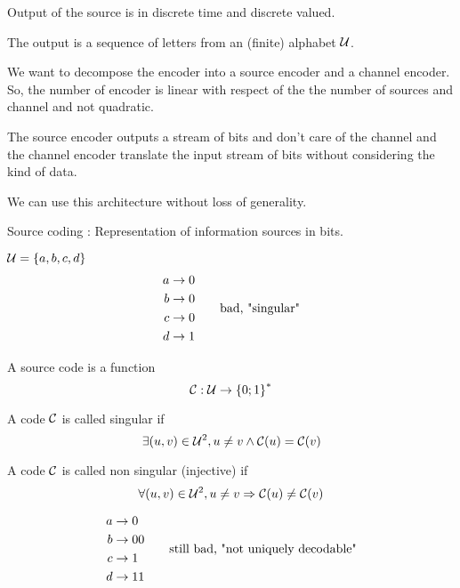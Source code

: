 Output of the source is in discrete time and discrete valued.

\begin{example}
    The output is a sequence of letters from an (finite) alphabet $\mathcal{U}$.
\end{example}

We want to decompose the encoder into a source encoder and a channel encoder. So, the number of encoder is linear with respect of the the number of sources and channel and not quadratic.

The source encoder outputs a stream of bits and don't care of the channel and the channel encoder translate the input stream of bits without considering the kind of data.

We can use this architecture without loss of generality.

\bigskip

Source coding : Representation of information sources in bits.

\begin{example}
    $\mathcal{U} = \left\{ a,b,c,d \right\}$
    \[
        \begin{aligned}
            a &\rightarrow 0\\
            b &\rightarrow 0\\
            c &\rightarrow 0\\
            d &\rightarrow 1
        \end{aligned}
        \qquad \text{bad, "singular"}            
    \]
\end{example}

A source code is a function
\[
    \mathcal{C} : \mathcal{U} \rightarrow \left\{ 0;1 \right\}^*
\]

\begin{definition}
    A code $\mathcal{C}$ is called singular  if
    \[
        \exists (u,v) \in \mathcal{U}^2, u \neq v \wedge \mathcal{C}(u) = \mathcal{C}(v)
    \]
\end{definition}

\begin{definition}
    A code $\mathcal{C}$ is called non singular (injective) if
    \[
        \forall (u,v) \in \mathcal{U}^2, u \neq v \Rightarrow \mathcal{C}(u) \neq \mathcal{C}(v)
    \]
\end{definition}

\begin{example}
    \[
        \begin{aligned}
            a &\rightarrow 0\\
            b &\rightarrow 00\\
            c &\rightarrow 1\\
            d &\rightarrow 11
        \end{aligned}
        \qquad \text{still bad, "not uniquely decodable"}            
    \]
\end{example}


